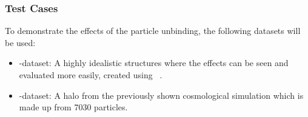 \begin{frame}
	\frametitle{Test Cases}
	
	To demonstrate the effects of the particle unbinding, the following datasets will be used:
	\begin{itemize}
		\item \dt-dataset: A highly idealistic structures where the effects can be seen and evaluated more easily, created using \dice\ \parencite{DICE}.\\[.5em]
		
		\item \cosmo-dataset: A halo from the previously shown cosmological simulation which is made up from 7030 particles.
		
	\end{itemize}

%
\end{frame}




